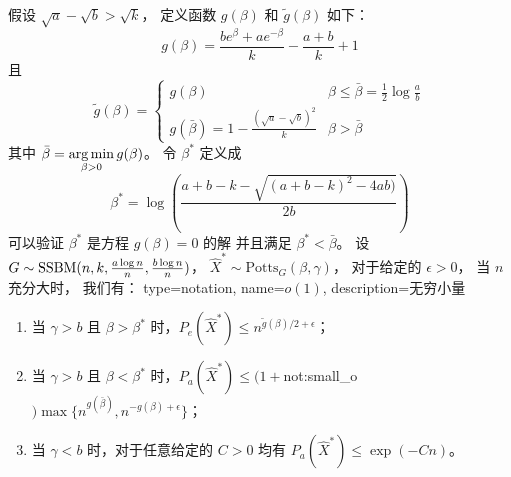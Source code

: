 \begin{theorem}\label{thm:phase_transition}
	假设 $\sqrt{a} - \sqrt{b} > \sqrt{k}$，
	定义函数 $g(\beta)$ 和 $ \tilde{g}(\beta)$ 如下：
	\begin{equation}
		\label{eq:g_beta_main_article}
		g(\beta) = \frac{be^{\beta} + a e^{-\beta}}{k} - \frac{a+b}{k} +1
	\end{equation}
	且
	\begin{equation}
		\label{eq:g_tilde_beta_main_article}
	\tilde{g}(\beta) = \begin{cases}
	g(\beta) & \beta \leq \bar{\beta} = \frac{1}{2}\log \frac{a}{b} \\
	g(\bar{\beta}) = 1 - \frac{\left(\sqrt{a} - \sqrt{b}\right)^2}{k} & \beta > \bar{\beta}
	\end{cases}
	\end{equation}
	其中
	$\bar{\beta} =  \displaystyle\operatorname*{arg\,min}_{\beta > 0} g(\beta)$。
	令 $\beta^*$ 定义成
	\begin{equation}\label{eq:beta_star}
	\beta^* = \log\left(\frac{a + b - k - \sqrt{(a + b - k)^2 - 4 a b)}}{2  b}\right)
	\end{equation}
	可以验证 $\beta^*$ 是方程 $g(\beta) = 0$ 的解 并且满足  $\beta^* < \bar{\beta}$。	
	设 $G\sim \operatorname{SSBM}(n, k, \frac{a \log n}{n}, \frac{b \log n}{n})$， $\hat{X}^* \sim \textrm{Potts}_G(\beta, \gamma)$，
	对于给定的 $\epsilon > 0$， 当 $n$ 充分大时， 我们有：
	{
	  type=notation,
	  name={$o(1)$},
	  description={无穷小量}
	}
	\begin{enumerate}
	\item 当 $\gamma > b$ 且 $\beta > \beta^*$ 时，$P_e(\hat{X}^*) \leq n^{\tilde{g}(\beta)/2 + \epsilon}$；
	\item 当 $\gamma > b$ 且 $\beta < \beta^*$ 时，$P_a(\hat{X}^*) \leq (1+$\gls{not:small_o}$)\max\{n^{g(\bar{\beta})}, n^{-g(\beta) + \epsilon}\}$；
	\item 当 $\gamma < b$ 时，对于任意给定的 $C>0$	均有 $P_a(\hat{X}^*) \leq \exp(-C n)$。
	\end{enumerate}
\end{theorem}


